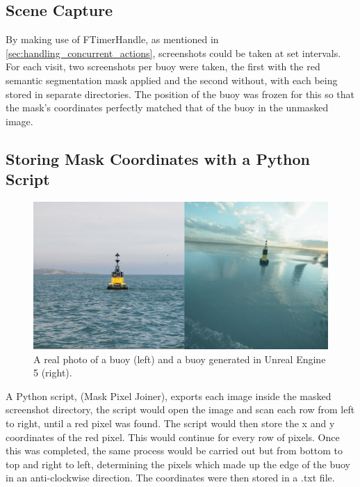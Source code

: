 \documentclass[10pt,twocolumn,letterpaper]{article}
\begin{document}
\subsection{Scene Capture}

By making use of FTimerHandle, as mentioned in \ref{sec:handling_concurrent_actions}, screenshots could be taken at set intervals. For each visit, two screenshots per buoy were taken, the first with the red semantic segmentation mask applied and the second without, with each being stored in separate directories. The position of the buoy was frozen for this so that the mask's coordinates perfectly matched that of the buoy in the unmasked image.

\subsection{Storing Mask Coordinates with a Python Script} \label {sec:mask_coordinates}

\begin{figure}[t]
    \centering
    \includegraphics[width=\linewidth]{images/buoy-realism-comparison.jpg}
    \caption{A real photo of a buoy (left) and a buoy generated in Unreal Engine 5 (right).}
    \label{fig:buoy_without_mask}
\end{figure}

A Python script, (Mask Pixel Joiner), exports each image inside the masked screenshot directory, the script would open the image and scan each row from left to right, until a red pixel was found. The script would then store the x and y coordinates of the red pixel. This would continue for every row of pixels. Once this was completed, the same process would be carried out but from bottom to top and right to left, determining the pixels which made up the edge of the buoy in an anti-clockwise direction. The coordinates were then stored in a .txt file.
\end{document}
